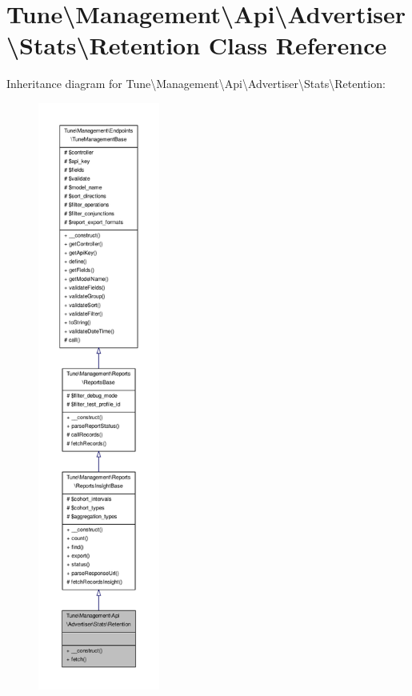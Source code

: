 \hypertarget{classTune_1_1Management_1_1Api_1_1Advertiser_1_1Stats_1_1Retention}{\section{Tune\textbackslash{}Management\textbackslash{}Api\textbackslash{}Advertiser\textbackslash{}Stats\textbackslash{}Retention Class Reference}
\label{classTune_1_1Management_1_1Api_1_1Advertiser_1_1Stats_1_1Retention}
}


Inheritance diagram for Tune\textbackslash{}Management\textbackslash{}Api\textbackslash{}Advertiser\textbackslash{}Stats\textbackslash{}Retention\-:
\nopagebreak
\begin{figure}[H]
\begin{center}
\leavevmode
\includegraphics[height=550pt]{classTune_1_1Management_1_1Api_1_1Advertiser_1_1Stats_1_1Retention__inherit__graph}
\end{center}
\end{figure}


